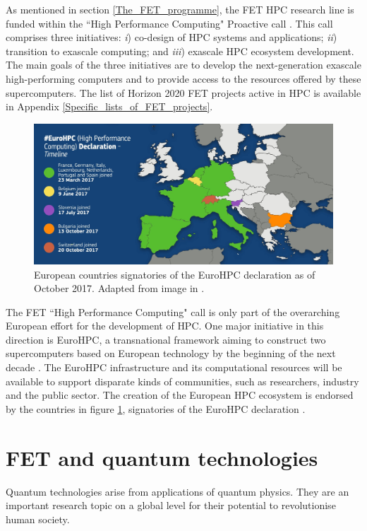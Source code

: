 As mentioned in section \ref{The_FET_programme}, the FET HPC research line is funded within the ``High Performance Computing" Proactive call \cite{HPC}. This call comprises three initiatives: \textit{i}) co-design of HPC systems and applications; \textit{ii}) transition to exascale computing; and \textit{iii}) exascale HPC ecosystem development. The main goals of the three initiatives are to develop the next-generation exascale high-performing computers and to provide access to the resources offered by these supercomputers. The list of Horizon 2020 FET projects active in HPC is available in Appendix \ref{Specific_lists_of_FET_projects}.

\begin{figure}[!t] 
 \begin{center}
 \includegraphics[scale=0.2]{Images/EuroHPC.jpg}
 \caption{European countries signatories of the EuroHPC declaration as of October 2017. Adapted from image in \cite{EuroHPC_countries}.}
 \label{EuroHPC_image}
 \end{center}
\end{figure}

The FET ``High Performance Computing" call is only part of the overarching European effort for the development of HPC. One major initiative in this direction is EuroHPC, a transnational framework aiming to construct two supercomputers based on European technology by the beginning of the next decade \cite{EuroHPC}. The EuroHPC infrastructure and its computational resources will be available to support disparate kinds of communities, such as researchers, industry and the public sector. The creation of the European HPC ecosystem is endorsed by the countries in figure \ref{EuroHPC_image}, signatories of the EuroHPC declaration \cite{EuroHPC_declaration}.  

\section{FET and quantum technologies} \label{FET_and_quantum_technologies}
Quantum technologies arise from applications of quantum physics. They are an important research topic on a global level for their potential to revolutionise human society.

